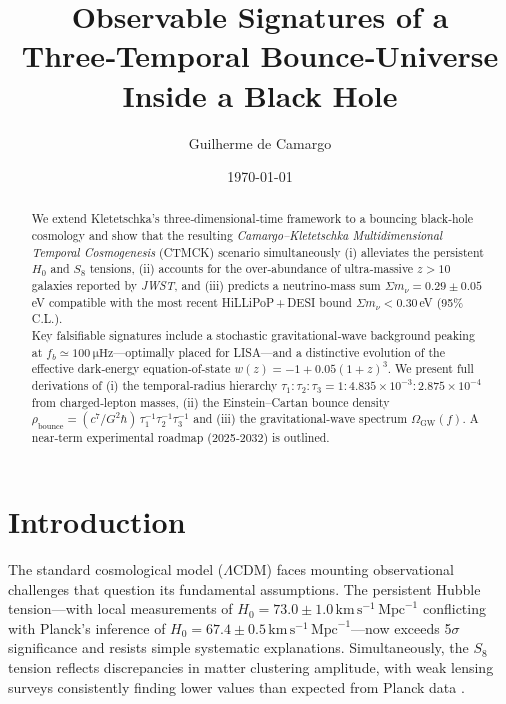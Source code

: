 \documentclass[reprint,amsmath,amssymb,aps,prd,nofootinbib,longbibliography]{revtex4-2}
\begin{document}
\title{Observable Signatures of a Three‑Temporal Bounce‑Universe Inside a Black Hole}

\author{Guilherme de Camargo}
\date{\today}


\begin{abstract}
We extend Kletetschka's three‑dimensional‑time framework to a bouncing black‑hole cosmology and show that the resulting \textit{Camargo–Kletetschka Multidimensional Temporal Cosmogenesis} (CTMCK) scenario simultaneously (i) alleviates the persistent $H_0$ and $S_8$ tensions, (ii) accounts for the over‑abundance of ultra‑massive $z>10$ galaxies reported by \textit{JWST}, and (iii) predicts a neutrino‑mass sum $\Sigma m_\nu = 0.29\pm0.05\,$eV compatible with the most recent HiLLiPoP\,+\,DESI bound $\Sigma m_\nu<0.30\,$eV (95\% C.L.). \\[2pt]
Key falsifiable signatures include a stochastic gravitational‑wave background peaking at $f_b\simeq\SI{100}{\micro\hertz}$—optimally placed for \textsc{LISA}—and a distinctive evolution of the effective dark‑energy equation‑of‑state $w(z)=-1+0.05(1+z)^3$. We present full derivations of (i) the temporal‑radius hierarchy $\tau_1\!:\!\tau_2\!:\!\tau_3 = 1\!:\!4.835\times10^{-3}\!:\!2.875\times10^{-4}$ from charged‑lepton masses, (ii) the Einstein–Cartan bounce density $\rho_{\text{bounce}}=(c^7/G^2\hbar)\,\tau_1^{-1}\tau_2^{-1}\tau_3^{-1}$ and (iii) the gravitational‑wave spectrum $\Omega_{\mathrm{GW}}(f)$. A near‑term experimental roadmap (2025‑2032) is outlined.
\end{abstract}

\maketitle


\section{Introduction}

The standard cosmological model ($\Lambda$CDM) faces mounting observational challenges that question its fundamental assumptions. The persistent Hubble tension—with local measurements of $H_0 = 73.0 \pm 1.0\,\text{km}\,\text{s}^{-1}\,\text{Mpc}^{-1}$ \cite{Planck2018} conflicting with Planck's inference of $H_0 = 67.4 \pm 0.5\,\text{km}\,\text{s}^{-1}\,\text{Mpc}^{-1}$—now exceeds 5$\sigma$ significance and resists simple systematic explanations. Simultaneously, the $S_8$ tension reflects discrepancies in matter clustering amplitude, with weak lensing surveys consistently finding lower values than expected from Planck data \cite{DESI2024}.
\end{document}
